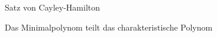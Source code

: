 \documentclass[class=article, crop=false]{standalone}
\begin{document}
\begin{zettel}{Satz von Cayley-Hamilton}

Das Minimalpolynom teilt das charakteristische Polynom

\end{zettel}
\end{document}
